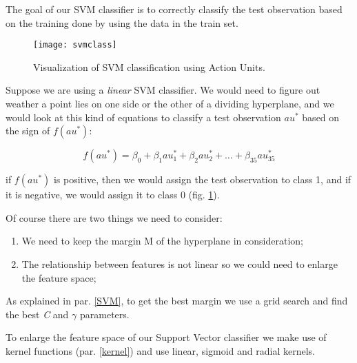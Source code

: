 The goal of our SVM classifier is to correctly classify the test observation based on the training done by using the data in the train set.

\begin{figure}[H]
	\centering
	\texttt{[image: svmclass]}
	\caption{Visualization of SVM classification using Action Units.}
	\label{fig:svmclass}
\end{figure}

Suppose we are using a \textit{linear} SVM classifier. We would need to figure out weather a point lies on one side or the other of a dividing hyperplane, and we would look at this kind of equations to classify a test observation $au^*$ based on the sign of $f(au^*)$:

\begin{equation} 
	f(au^*) = \beta_0 + \beta_1 au^*_{1} + \beta_2 au^*_{2} + \dots + \beta_{35} au^*_{35}
\end{equation}

if $f(au^*)$ is positive, then we would assign the test observation to class 1, and if it is negative, we would assign it to class 0 (fig. \ref{fig:svmclass}).

Of course there are two things we need to consider:
\begin{enumerate}
	\item We need to keep the margin M of the hyperplane in consideration;
	\item The relationship between features is not linear so we could need to enlarge the feature space;
\end{enumerate}

As explained in par. \ref{SVM}, to get the best margin we use a grid search and find the best \textit{C} and $\gamma$ parameters.

To enlarge the feature space of our Support Vector classifier we make use of kernel functions (par. \ref{kernel}) and use linear, sigmoid and radial kernels.




